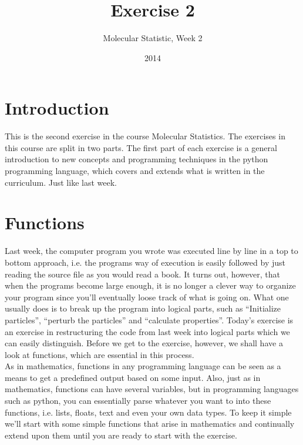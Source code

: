 \documentclass{article}
\title{Exercise 2}
\author{Molecular Statistic, Week 2}
\date{2014}
\begin{document}

\maketitle

\section{Introduction}

This is the second exercise in the course Molecular Statistics. The exercises
in this course are split in two parts. The first part of each exercise is a
general introduction to new concepts and programming techniques in the python
programming language, which covers and extends what is written in the
curriculum.
Just like last week.

\section{Functions}

Last week, the computer program you wrote was executed line by line in a top to
bottom approach, i.e. the programs way of execution is easily followed by just
reading the source file as you would read a book. It turns out, however, that
when the programs become large enough, it is no longer a clever way to organize
your program since you'll eventually loose track of what is going on. What one
usually does is to break up the program into logical parts, such as “Initialize
particles”, “perturb the particles” and “calculate properties”. Today's
exercise is an exercise in restructuring the code
from last week into logical parts which we can easily distinguish. Before we
get to the exercise, however, we shall have a look at functions, which are
essential in this process.\\

As in mathematics, functions in any programming language can be seen as a
means to get a predefined output based on some input. Also, just as in
mathematics, functions can have several variables, but in programming languages
such as python, you can essentially parse whatever you want to into these
functions, i.e. lists, floats, text and even your own data types. To keep it
simple we'll start with some simple functions that arise in mathematics and
continually extend upon them until you are ready to start with the exercise.\\
\end{document}
